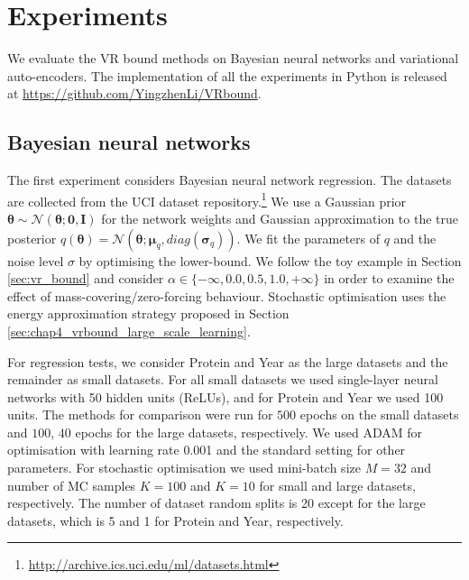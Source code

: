 \section{Experiments}
We evaluate the VR bound methods on Bayesian neural networks and variational auto-encoders. The implementation of all the experiments in Python is released at \url{https://github.com/YingzhenLi/VRbound}.

\subsection{Bayesian neural networks}

The first experiment considers Bayesian neural network regression. The datasets are collected from the UCI dataset repository.\footnote{\url{http://archive.ics.uci.edu/ml/datasets.html}} We use a Gaussian prior $\bm{\theta} \sim \mathcal{N}(\bm{\theta}; \bm{0}, \bm{I})$ for the network weights and Gaussian approximation to the true posterior $q(\bm{\theta}) = \mathcal{N}(\bm{\theta}; \bm{\mu}_q, diag(\bm{\sigma}_q))$. We fit the parameters of $q$ and the noise level $\sigma$ by optimising the lower-bound. We follow the toy example in Section \ref{sec:vr_bound} and consider $\alpha \in \{-\infty, 0.0, 0.5, 1.0, +\infty \}$ in order to examine the effect of mass-covering/zero-forcing behaviour. Stochastic optimisation uses the energy approximation strategy proposed in Section \ref{sec:chap4_vrbound_large_scale_learning}. 

For regression tests, we consider Protein and Year as the large datasets and the remainder as small datasets. For all small datasets we used single-layer neural networks with 50 hidden units (ReLUs), and for Protein and Year we used 100 units. The methods for comparison were run for $500$ epochs on the small datasets and $100$, $40$ epochs for the large datasets, respectively. We used ADAM \citep{kingma:adam2015} for optimisation with learning rate 0.001 and the standard setting for other parameters. For stochastic optimisation we used mini-batch size $M = 32$ and number of MC samples $K=100$ and $K=10$ for small and large datasets, respectively. The number of dataset random splits is 20 except for the large datasets, which is 5 and 1 for Protein and Year, respectively. 

